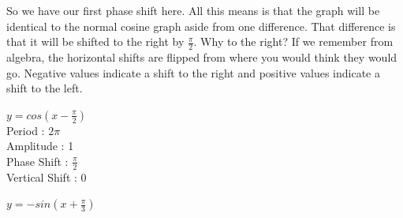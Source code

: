\documentclass[10pt,letterpaper]{amspset}
\begin{document}
\begin{solution}[Solution]
    So we have our first phase shift here. All this means is that the graph will be identical to the normal cosine graph aside from one difference. That difference is that it will be shifted to the right by $\frac{\pi}{2}$. Why to the right? If we remember from algebra, the horizontal shifts are flipped from where you would think they would go. Negative values indicate a shift to the right and positive values indicate a shift to the left. 
    \medskip
   
    \noindent $y = cos(x - \frac{\pi}{2})$ \\[+2mm]
    Period : $2\pi$ \\[+2mm]
    Amplitude : 1 \\[+2mm]
    Phase Shift : $\frac{\pi}{2}$ \\[+2mm]
    Vertical Shift : 0 \\
   
   
\end{solution}


\pagebreak


\begin{problem}[5]
    $y = -sin(x + \frac{\pi}{3})$
\end{problem}
\end{document}
